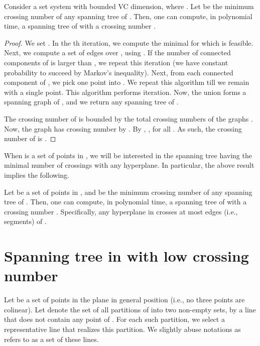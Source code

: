 \documentclass[12pt]{article}
\newcommand{\Term}[1]{\textsf{#1}}
\newcommand{\VC}{\Term{V{C}}\xspace}
\begin{document}
\begin{theorem}
    Consider a set system  with bounded \VC
    dimension, where .  Let  be the minimum
    crossing number of any spanning tree of .  Then, one can
    compute, in polynomial time, a spanning tree  of  with
    a crossing number .

\end{theorem}
\begin{proof}
    We set . In the th iteration, we compute
    the minimal  for which  is
    feasible. Next, we compute a set of edges  over ,
    using . If the number of connected components of
     is larger than , we
    repeat this iteration (we have constant probability to succeed by
    Markov's inequality). Next, from each connected component of
    , we pick one point into . We repeat
    this algorithm till we remain with a single point. This algorithm
    performs  iteration.  Now, the union  forms a spanning graph of , and we return any
    spanning tree  of .


    The crossing number of  is bounded by the total crossing
    numbers of the graphs . Now, the graph  has crossing number  by . By
    , , for all . As such, the
    crossing number of  is .
\end{proof}

\medskip

When  is a set of points in , we will be interested in
the spanning tree having the minimal number of crossings with any
hyperplane. In particular, the above result implies the following.

\begin{corollary}
    Let  be a set of  points in , and  be the
    minimum crossing number of any spanning tree of .  Then,
    one can compute, in polynomial time, a spanning tree  of
     with a crossing number .  Specifically, any hyperplane in  crosses
    at most  edges (i.e., segments) of .

\end{corollary}


\section{Spanning tree in  with low crossing number}

Let  be a set of  points in the plane in general position
(i.e., no three points are colinear). Let  denote
the set of all partitions of  into two non-empty sets, by a
line that does not contain any point of . For each such
partition, we select a representative line that realizes this
partition. We slightly abuse notations as refers to 
as a set of these lines.
\end{document}
